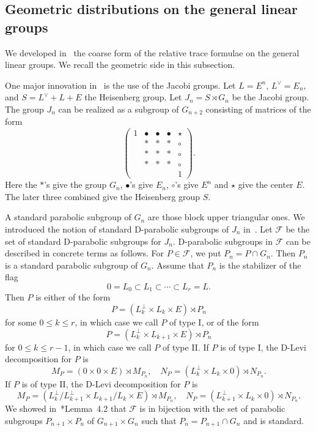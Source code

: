 \documentclass[letterpaper,11pt]{amsart}
\newcommand{\cF}{\mathcal{F}}
\newcommand{\<}{\negthickspace}
\theoremstyle{definition}
\theoremstyle{plain}
\theoremstyle{remark}
\numberwithin{equation}{section}
\begin{document}
\subsection{Geometric distributions on the general linear groups}

We developed in~\cite{BLX1} the coarse form of the relative trace formulae on the general linear groups. We recall the geometric side in this subsection. 

One major innovation in~\cite{BLX1} is the use of the Jacobi groups. Let $L = E^n$, $L^\vee = E_n$, and $S = L^\vee + L + E$ the Heisenberg group. Let $J_n = S \rtimes G_n$ be the Jacobi group. The group $J_n$ can be realized as a subgroup of $G_{n+2}$ consisting of matrices of the form
    \[
    \begin{pmatrix} 1 &\bullet &\bullet &\bullet &\star \\
    &*&*&*&\circ\\ &*&*&*&\circ \\
    &*&*&*&\circ \\ &&&& 1\end{pmatrix}.
    \]
Here the $*$'s give the group $G_n$, $\bullet$'s give $E_n$, $\circ$'s give $E^n$ and $\star$ give the center $E$. The later three combined give the Heisenberg group $S$. 

A standard parabolic subgroup of $G_n$ are those block upper triangular ones. We introduced the notion of standard D-parabolic subgroups of $J_n$ in~\cite{BLX1}. Let $\cF$ be the set of standard D-parabolic subgroups for $J_n$. D-parabolic subgroups in $\cF$ can be described in concrete terms as follows. For $P \in \cF$, we put $P_n = P
\cap G_n$. Then $P_n$ is a standard parabolic subgroup of $G_n$. Assume that $P_n$ is the stabilizer of the flag
    \begin{equation}    \label{eq:increasing_sequence}
     0 = L_0 \subset L_1 \subset \cdots \subset L_r=L.
    \end{equation}
Then  $P$ is either of the form
    \begin{equation}    \label{eq:Type 1 D parabolic}
    P = (L_k^\perp \times L_k \times E) \rtimes P_n
    \end{equation}
for some $0 \leq k \leq r$, in which case we call $P$ of type I,  or of the form
    \begin{equation}    \label{eq:Type 2 D parabolic}
    P  = (L_k^\perp \times L_{k+1} \times E) \rtimes P_n
    \end{equation}
for $0 \le k \le r-1$, in which case we call $P$ of type II. If $P$ is of type I,
the D-Levi decomposition for $P$ is
    \[
     M_{P}  = (0 \times 0 \times E) \rtimes M_{P_n}, \quad
    N_{P}  = (L_k^\perp \times L_k \times 0) \rtimes N_{P_n}.
    \]
If $P$ is of type II, the D-Levi decomposition for $P$ is
    \[
        M_{P}
        = (L_k^\perp/L_{k+1}^{\perp} \times L_{k+1}/L_k \times E)
        \rtimes M_{P_n}, \quad
        N_{P}  = (L_{k+1}^\perp \times L_k \times 0) \rtimes N_{P_n}.
    \]
We showed in~\cite{BLX1}*{Lemma~4.2} that $\cF$ is in bijection with the set of parabolic subgroups $P_{n+1} \times P_n$ of $G_{n+1} \times G_n$ such that $P_n = P_{n+1} \cap G_n$ and is standard.
    
\end{document}
